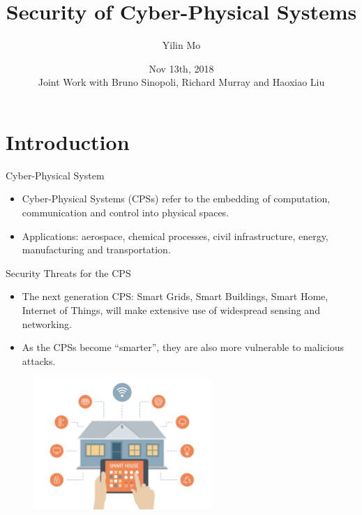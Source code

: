 \documentclass[10pt]{beamer}
\title[Secure CPS]{Security of Cyber-Physical Systems}
\author[Yilin Mo]{Yilin Mo}
\institute[Tsinghua]{
  Department of Automation\\ Tsinghua University\\
}
\date[Nov 13, 2018]{ Nov 13th, 2018\\ 
  \small Joint Work with Bruno Sinopoli, Richard Murray and Haoxiao Liu}
\begin{document}
\maketitle 

\section{Introduction}

\begin{frame}{Cyber-Physical System}
  \begin{itemize}
  \item Cyber-Physical Systems (CPSs) refer to the embedding of computation, communication and control into physical spaces.
    \begin{center}
    \end{center}
  \item Applications: aerospace, chemical processes, civil infrastructure, energy, manufacturing and transportation. 
  \end{itemize}
\end{frame}

\begin{frame}{Security Threats for the CPS}
  \begin{itemize}
  \item The next generation CPS: Smart Grids, Smart Buildings, Smart Home, Internet of Things, will make extensive use of widespread sensing and networking.
  \item As the CPSs become ``smarter'', they are also more vulnerable to malicious attacks.
  \end{itemize}
  \begin{figure}[ht]
    \centering
    \includegraphics[width=0.6\textwidth]{SmartHome.jpg}
  \end{figure}
\end{frame}
\end{document}

